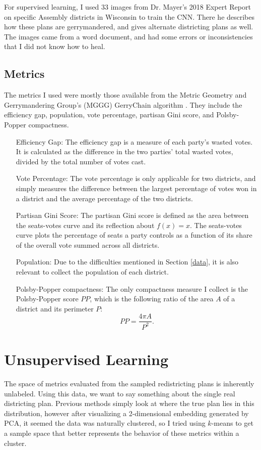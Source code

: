 \documentclass[a4paper]{article}
\theoremstyle{definition}
\begin{document}
	For supervised learning, I used 33 images from Dr. Mayer's 2018 Expert Report \cite{KenExpert} on specific Assembly districts in Wisconsin to train the CNN. There he describes how these plans are gerrymandered, and gives alternate districting plans as well. The images came from a word document, and had some errors or inconsistencies that I did not know how to heal.
	
	\subsection{Metrics}
	The metrics I used were mostly those available from the Metric Geometry and Gerrymandering Group's (MGGG) GerryChain algorithm \cite{ReCom}. They include the efficiency gap, population, vote percentage, partisan Gini score, and Polsby-Popper compactness.
	\begin{itemize}
		\item[Efficiency Gap:] The efficiency gap is a measure of each party's wasted votes. It is	calculated as the difference in the two parties’ total wasted votes, divided by the total number of votes cast.
		\item[Vote Percentage:] The vote percentage is only applicable for two districts, and simply measures the difference between the largest percentage of votes won in a district and the average percentage of the two districts.
		\item[Partisan Gini Score:] The partisan Gini score is defined as the area between the seats-votes
		curve and its reflection about $ f(x)=x $. The seats-votes curve plots the percentage of seats a party controls as a function of its share of the overall vote summed across all districts.
		\item[Population:] Due to the difficulties mentioned in Section \ref{data}, it is also relevant to collect the population of each district.
		\item[Polsby-Popper compactness:] The only compactness measure I collect is the Polsby-Popper score $ PP $, which is the following ratio of the area $ A $ of a district and its perimeter $ P $:
		\[ PP = \frac{4\pi A}{P^2}. \]
	\end{itemize}
	
	\section{Unsupervised Learning}
	The space of metrics evaluated from the sampled redistricting plans is inherently unlabeled. Using this data, we want to say something about the single real districting plan. Previous methods simply look at where the true plan lies in this distribution, however after visualizing a 2-dimensional embedding generated by PCA, it seemed the data was naturally clustered, so I tried using $ k $-means to get a sample space that better represents the behavior of these metrics within a cluster.
	
\end{document}
